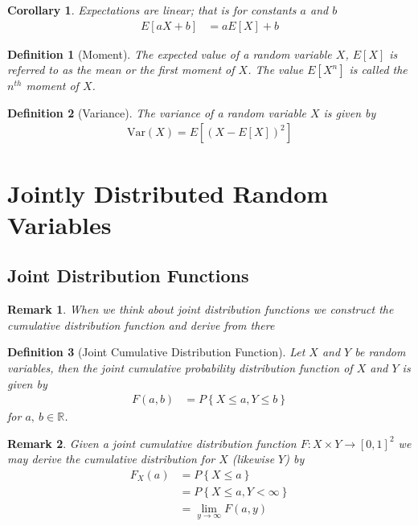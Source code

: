 \documentclass[11pt, oneside]{book}   	%
\newtheorem{definition}{Definition}[chapter]
\newtheorem{remark}{Remark}[chapter]
\newtheorem{corollary}{Corollary}[chapter]
\newcommand{\set}[1]{\left\{#1\right\}}
\newcommand{\var}[1]{\mathrm{Var}\left(#1\right)}
\begin{document}
\begin{spacing}{1.618}
\begin{corollary}
	Expectations are linear; that is for constants $a$ and $b$
	\begin{alignat}{4}
		E[aX+b]&=aE[X]+b
	\end{alignat}
\end{corollary}

\begin{definition}[Moment]
	The expected value of a random variable $X$, $E[X]$ is referred to as the \emph{mean} or the first \emph{moment} of $X$. The value $E\left[X^n\right]$ is called the $n^{th}$ moment of $X$. 
\end{definition}

\begin{definition}[Variance]
	The \emph{variance} of a random variable $X$ is given by 
	\begin{alignat}{4}
		\var{X}=E\left[\left(X-E[X]\right)^2\right]
	\end{alignat}
\end{definition}

\section{Jointly Distributed Random Variables}

\subsection{Joint Distribution Functions}

\begin{remark}
	When we think about joint distribution functions we construct the cumulative distribution function and derive from there
\end{remark}

\begin{definition}[Joint Cumulative Distribution Function]
	Let $X$ and $Y$ be random variables, then the \emph{joint cumulative probability distribution function} of $X$ and $Y$ is given by
	\begin{alignat}{4}
		F(a, b)&=P\set{X\leq a, Y\leq b}
	\end{alignat}
	for $a,~b\in\mathbb{R}$. 
\end{definition}

\begin{remark}
	Given a joint cumulative distribution function $F:X\times Y\to [0,1]^2$ we may derive the cumulative distribution for $X$ (likewise $Y$) by 
	\begin{alignat}{4}
		F_X(a)&=P\set{X\leq a} \\
			&=P\set{X\leq a, Y<\infty} \\
			&=\lim_{y\to\infty}F(a, y)
	\end{alignat}
\end{remark}


\end{spacing}
\end{document}
